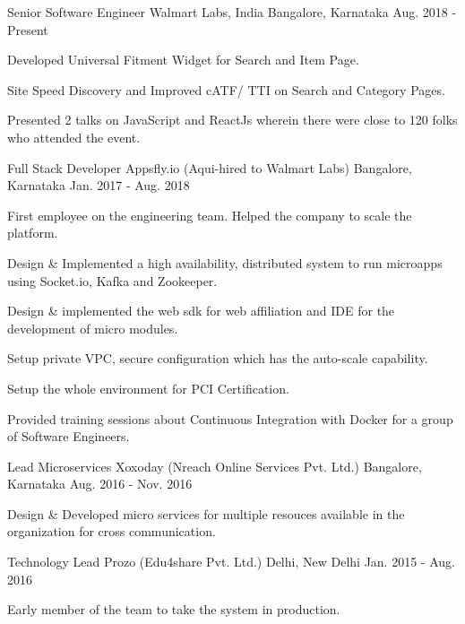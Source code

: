 \begin{cventries}
  \cventry
    {Senior Software Engineer}
    {Walmart Labs, India}
    {Bangalore, Karnataka}
    {Aug. 2018 - Present}
    {
      \begin{cvitems}
        \item {Developed Universal Fitment Widget for Search and Item Page.}
        \item {Site Speed Discovery and Improved cATF/ TTI on Search and Category Pages.}
        \item {Presented 2 talks on JavaScript and ReactJs wherein there were close to 120 folks who attended the event.}
      \end{cvitems}
    }
  \cventry
    {Full Stack Developer}
    {Appsfly.io (Aqui-hired to Walmart Labs)}
    {Bangalore, Karnataka}
    {Jan. 2017 - Aug. 2018}
    {
      \begin{cvitems}
        \item {First employee on the engineering team. Helped the company to scale the platform.}
        \item {Design \& Implemented a high availability, distributed system to run microapps using Socket.io, Kafka and Zookeeper.}
        \item {Design \& implemented the web sdk for web affiliation and IDE for the development of micro modules.}
        \item {Setup private VPC, secure configuration which has the auto-scale capability.}
        \item {Setup the whole environment for PCI Certification.}
        \item {Provided training sessions about Continuous Integration with Docker for a group of Software Engineers.}
      \end{cvitems}
    }
  \cventry
    {Lead Microservices}
    {Xoxoday (Nreach Online Services Pvt. Ltd.)}
    {Bangalore, Karnataka}
    {Aug. 2016 - Nov. 2016}
    {
      \begin{cvitems}
        \item {Design \& Developed micro services for multiple resouces available in the organization for cross communication.}
      \end{cvitems}
    }
  \cventry
    {Technology Lead}
    {Prozo (Edu4share Pvt. Ltd.)}
    {Delhi, New Delhi}
    {Jan. 2015 - Aug. 2016}
    {
      \begin{cvitems}
        \item {Early member of the team to take the system in production.}

\end{cvitems}}
\end{cventries}
